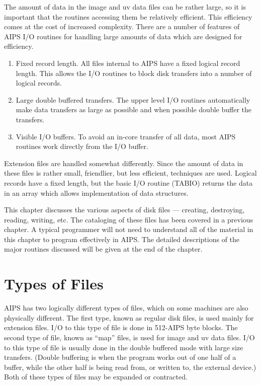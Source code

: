 The amount of data in the image and uv data files can be rather large,
so it is important that the routines accessing them be relatively
efficient. This efficiency comes at the cost of increased complexity.
There are a number of features of AIPS I/O routines for handling large
amounts of data which are designed for efficiency.
\begin{enumerate} %
\item Fixed record length.  All files internal to AIPS have a fixed logical
record length.  This allows the I/O routines to block disk transfers
into a number of logical records.
\item Large double buffered transfers. The upper level I/O routines
automatically make data transfers as large as possible and when
possible double buffer the transfers.
\item Visible I/O buffers. To avoid an in-core transfer of all data, most
AIPS routines work directly from the I/O buffer.

\end{enumerate} %
Extension files are handled somewhat differently.  Since the amount of
data in these files is rather small, friendlier, but less efficient,
techniques are used.  Logical records have a fixed length, but the
basic I/O routine (TABIO) returns the data in an array which allows
implementation of data structures.

This chapter discusses the various aspects of disk files --- creating,
destroying, reading, writing, etc.  The cataloging of these files has
been covered in a previous chapter.  A typical programmer will not
need to understand all of the material in this chapter to program
effectively in AIPS.  The detailed descriptions of the major routines
discussed will be given at the end of the chapter.


\section{Types of Files}
AIPS has two logically different types of files, which on some
machines are also physically different.  The first type, known as
regular disk files, is used mainly for extension files.  I/O to this
type of file is done in 512-AIPS byte blocks.  The second type of
file, known as ``map'' files, is used for image and uv data files.
I/O to this type of file is usually done in the double buffered mode
with large size transfers.  (Double buffering is when the program
works out of one half of a buffer, while the other half is being read
from, or written to, the external device.)  Both of these types of
files may be expanded or contracted.

